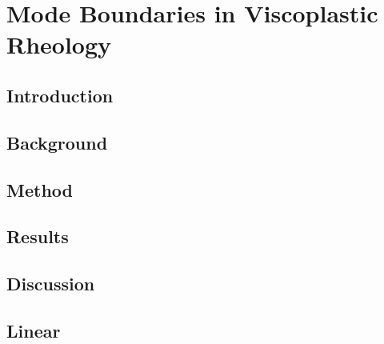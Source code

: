 \documentclass[letterpaper,10pt,english]{jupyterBook}
\begin{document}
\chapter{Mode Boundaries in Viscoplastic Rheology}
\label{\detokenize{content/chapter_05_viscoplastic/abstract:mode-boundaries-in-viscoplastic-rheology}}\label{\detokenize{content/chapter_05_viscoplastic/abstract::doc}}

\section{Introduction}
\label{\detokenize{content/chapter_05_viscoplastic/section01_introduction:introduction}}\label{\detokenize{content/chapter_05_viscoplastic/section01_introduction::doc}}

\section{Background}
\label{\detokenize{content/chapter_05_viscoplastic/section02_background:background}}\label{\detokenize{content/chapter_05_viscoplastic/section02_background::doc}}

\section{Method}
\label{\detokenize{content/chapter_05_viscoplastic/section03_methods:method}}\label{\detokenize{content/chapter_05_viscoplastic/section03_methods::doc}}

\section{Results}
\label{\detokenize{content/chapter_05_viscoplastic/section04_results:results}}\label{\detokenize{content/chapter_05_viscoplastic/section04_results::doc}}

\section{Discussion}
\label{\detokenize{content/chapter_05_viscoplastic/section05_discussion:discussion}}\label{\detokenize{content/chapter_05_viscoplastic/section05_discussion::doc}}

\section{Linear}
\label{\detokenize{content/chapter_05_viscoplastic/conclusion:linear}}\label{\detokenize{content/chapter_05_viscoplastic/conclusion::doc}}
\end{document}
